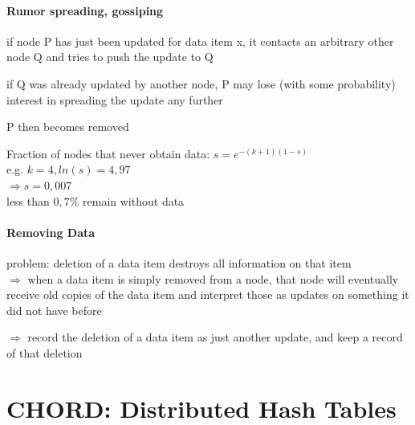 \documentclass[ngerman,a4paper]{report}
\begin{document}
\subsubsection*{Rumor spreading, gossiping}
\begin{compactitem}
	\item if node P has just been updated for data item x, it contacts an arbitrary other node Q and tries to push the update to Q
	\item if Q was already updated by another node, P may lose (with some probability) interest in spreading the update any further
	\item P then becomes removed\item
	\item Fraction of nodes that never obtain data: $s=e^{-(k+1)(1-s)}$\\
		e.g. $k=4, ln(s) = 4,97$\\
		$\Rightarrow s = 0,007$\\
		less than $0,7\%$ remain without data\\
\end{compactitem}


\subsubsection*{Removing Data}
\begin{compactitem}
	\item problem: deletion of a data item destroys all information on that item\\
		$\Rightarrow$ when a data item is simply removed from a node, that node will eventually receive old copies of the data item and interpret those as updates on something it did not have before
	\item $\Rightarrow$ record the deletion of a data item as just another update, and keep a record of that deletion
\end{compactitem}


\chapter{CHORD: Distributed Hash Tables}
\end{document}
